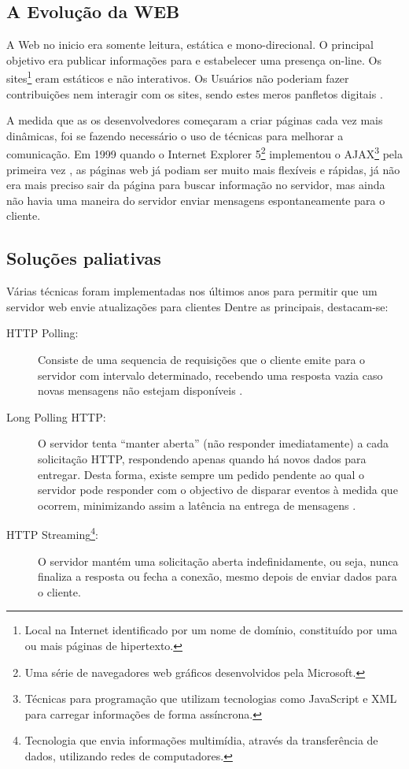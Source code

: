 \subsection{A Evolução da WEB}
A Web no inicio era somente leitura, estática e mono-direcional. O principal objetivo era publicar informações para e estabelecer uma presença on-line. Os sites\footnote{Local na Internet identificado por um nome de domínio, constituído por uma ou mais páginas de hipertexto.} eram estáticos e não interativos. Os Usuários não poderiam fazer contribuições nem interagir com os sites, sendo estes meros panfletos digitais \cite[p.~2-3]{Aghaei2012}.

A medida que as os desenvolvedores começaram a criar páginas cada vez mais dinâmicas, foi se fazendo necessário o uso de técnicas para melhorar a comunicação. Em 1999 quando o Internet Explorer 5\footnote{Uma série de navegadores web gráficos desenvolvidos pela Microsoft.} implementou o AJAX\footnote{Técnicas para programação que utilizam tecnologias como JavaScript e XML para carregar informações de forma assíncrona.} pela primeira vez \cite{Asleson2006}, as páginas web já podiam ser muito mais flexíveis e rápidas, já não era mais preciso sair da página para buscar informação no servidor, mas ainda não havia uma maneira do servidor enviar mensagens espontaneamente para o cliente.

\subsection{Soluções paliativas}

Várias técnicas foram implementadas nos últimos anos para permitir que um servidor web envie atualizações para clientes Dentre as principais, destacam-se:

\begin{description}
	\item[HTTP Polling:] Consiste de uma sequencia de requisições que o cliente emite para o servidor com intervalo determinado, recebendo uma resposta vazia caso novas mensagens não estejam disponíveis \cite{Pimentel2012}.

	\item[Long Polling HTTP:] O servidor tenta “manter aberta” (não responder imediatamente) a cada solicitação HTTP, respondendo apenas quando há novos dados para entregar. Desta forma, existe sempre um pedido pendente ao qual o servidor pode responder com o objectivo de disparar eventos à medida que ocorrem, minimizando assim a latência na entrega de mensagens \cite{Aghaei2012}.

	\item[HTTP Streaming\footnote{Tecnologia que envia informações multimídia, através da transferência de dados, utilizando redes de computadores.}:] O servidor mantém uma solicitação aberta indefinidamente, ou seja, nunca finaliza a resposta ou fecha a conexão, mesmo depois de enviar dados para o cliente.
\end{description}

